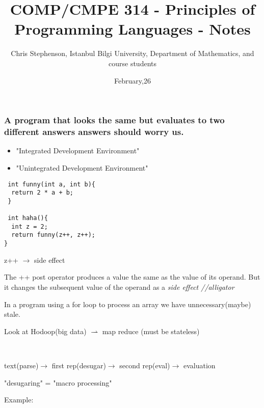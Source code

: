 \documentclass{article}
\begin{document}
\title{COMP/CMPE 314 - Principles of Programming Languages - Notes}
\author{Chris Stephenson, Istanbul Bilgi University, Department of Mathematics, and course students}
\date{February,26}
\maketitle

\subsubsection*{A program that looks the same but evaluates to two different answers answers should worry us.}
  \begin{itemize}
        \item "Integrated Development Environment"
		\item "Unintegrated Development Environment"
   \end{itemize}


\begin{verbatim} 
 int funny(int a, int b){ 
  return 2 * a + b;
 }
 
 int haha(){
  int z = 2;
  return funny(z++, z++);
}
\end{verbatim}
%

\center z++ $\rightarrow$ side effect\
 
\begin{flushleft}
The ++ post operator produces a value the same as the value of its operand. But it changes the subsequent value of the operand as a \emph{\color{red} side effect //alligator}\\
\end{flushleft}

\begin{flushleft}
In a program using a for loop to process an array we have unnecessary(maybe) stale.
\end{flushleft}

\begin{flushleft}
Look at Hodoop(big data) $\rightharpoonup$ map reduce (must be stateless)
\end{flushleft}\

\center text(parse)$\rightarrow$ first rep(desugar)$\rightarrow$ second rep(eval)$\rightarrow$ evaluation\


\center "desugaring" = "macro processing"\

\begin{flushleft}
Example:
\end{flushleft}
\end{document}
